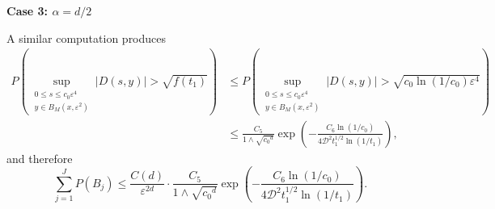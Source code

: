 \documentclass[12pt]{amsart}
\numberwithin{equation}{section}
\newcommand{\1}{\mathbf{1}}
\begin{document}
\textbf{Case 3: $\alpha=d/2$}

A similar computation produces
\begin{equation*}
    \begin{split}
        P\left(\sup_{\substack{0\leq s\leq c_0\varepsilon^4\\ y\in B_M(x,\varepsilon^2)}}\vert D(s,y)\vert>\sqrt{f(t_1)}\right)&\leq P\left(\sup_{\substack{0\leq s\leq c_0\varepsilon^4\\ y\in B_M(x,\varepsilon^2)}}\vert D(s,y)\vert>\sqrt{c_0\ln(1/c_0)\varepsilon^4}\right)\\
        &\leq \frac{C_5}{1\wedge \sqrt{{c_0}^d}}\exp\left(-\frac{C_6\ln(1/c_0)}{4\mathcal{D}^2t_1^{1/2}\ln(1/t_1)}\right),
    \end{split}
\end{equation*}
and therefore
\begin{equation*}
\sum_{j=1}^{J}P(B_j)\leq\frac{C(d)}{\varepsilon^{2d}}\cdot\frac{C_5}{1\wedge \sqrt{{c_0}^d}}\exp\left(-\frac{C_6\ln(1/c_0)}{4\mathcal{D}^2t_1^{1/2}\ln(1/t_1)}\right).
\end{equation*}
\end{document}
